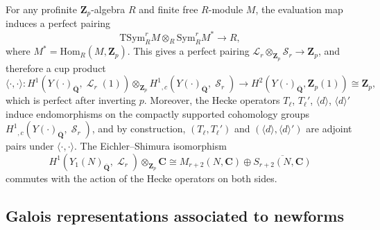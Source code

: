 \documentclass[10pt,letterpaper]{amsart}
\theoremstyle{plain}
\theoremstyle{definition}
\theoremstyle{definition}
\theoremstyle{plain}
\theoremstyle{plain}
\theoremstyle{plain}
\theoremstyle{remark}
\numberwithin{equation}{section}
\DeclareMathOperator{\et}{\acute{e}t}
\DeclareMathOperator{\Ll}{\mathscr{L}}
\DeclareMathOperator{\Ss}{\mathscr{S}}
\newcommand{\bC}{\mathbf{C}}
\newcommand{\Q}{\mathbf{Q}}
\newcommand{\Z}{\mathbf{Z}}
\begin{document}
For any profinite $\Z_p$-algebra $R$ and finite free $R$-module $M$, the evaluation map induces a perfect pairing
\begin{equation*}
    \text{TSym}^r_RM\otimes_R\text{Sym}^r_R M^{*}\rightarrow R,
\end{equation*}
where $M^{*}=\text{Hom}_R(M,\Z_p)$. This gives a perfect pairing $\mathscr{L}_r\otimes_{\Z_p}\mathscr{S}_r\rightarrow \Z_p$, and therefore a cup product
\begin{equation*}
    \langle \cdot,\cdot\rangle: H^1_{\et}(Y(\cdot)_{\overline{\Q}},\Ll_r(1))\otimes_{\Z_p}H^1_{\et,c}(Y(\cdot)_{\overline{\Q}},\Ss_r)\rightarrow H^2_{\et}(Y(\cdot)_{\overline{\Q}},\Z_p(1))\cong \Z_p,
\end{equation*}
which is perfect %
after inverting $p$. Moreover, the Hecke operators $T_\ell$, $T_\ell'$, $\langle d\rangle$, $\langle d\rangle '$ induce endomorphisms on the compactly supported cohomology groups $H^1_{\et,c}(Y(\cdot)_{\overline{\Q}},\Ss_r)$, and by construction, $(T_\ell,T_\ell')$ and $(\langle d\rangle,\langle d\rangle ')$ are adjoint pairs under $\langle \cdot,\cdot\rangle$. The Eichler--Shimura isomorphism \cite{shimura-pink}
\begin{equation*}
    H^1_{\et}(Y_1(N)_{\overline{\Q}},\Ll_r)\otimes_{\Z_p}\bC\cong M_{r+2}(N,\bC)\oplus \overline{S_{r+2}(N,\bC)}
\end{equation*}
commutes with the action of the Hecke operators on both sides.



\subsection{Galois representations associated to newforms} 
\label{subsec:Galreps}
\end{document}
